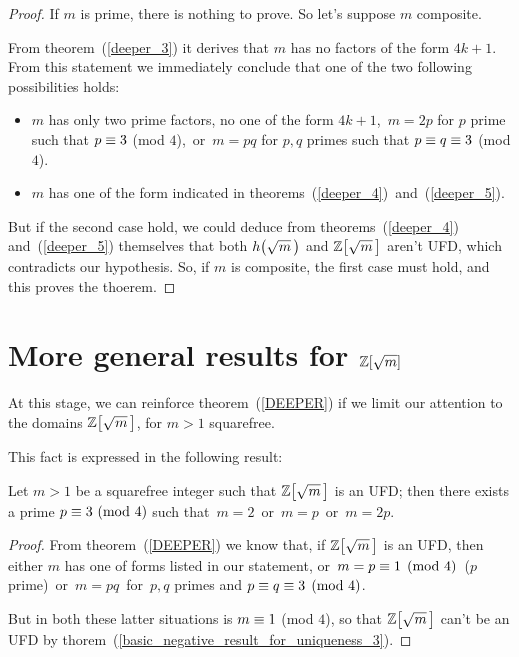 \begin{proof}
%
If $m$ is prime, there is nothing to prove. So let's
suppose $m$ composite.

From theorem~(\ref{deeper_3}) it derives
that $m$ has no factors of the form $4k + 1$.
From this statement we immediately conclude that one of
the two following possibilities holds:
\begin{itemize}

\item\: $m$ has only two prime factors, no one of the
form $4k + 1$, \ie\,$m = 2p$ for $p$ prime such that
$p \equiv 3$ (mod $4$),\, or\, $m = pq$ for $p,q$
primes such that $p \equiv q \equiv 3$ (mod $4$).

\item\: $m$ has one of the form indicated in
theorems~(\ref{deeper_4})~and~(\ref{deeper_5}).

\end{itemize}

But if the second case hold, we could deduce from
theorems~(\ref{deeper_4}) and~(\ref{deeper_5})
themselves that both $\hh{m}$ and $\ZZ{m}$ aren't UFD,
which contradicts our hypothesis.
So, if $m$ is composite, the first case must hold,
and this proves the thoerem.
%
\end{proof}

\section{More general results for $\mathbb{Z}[\sqrt{m}]$} 

At this stage, we can reinforce theorem~(\ref{DEEPER})
if we limit our attention to the domains
$\ZZ{m}$, for $m > 1$ squarefree.

This fact is expressed in the following result:

\begin{thm}\label{Z_deeper_1}
Let $m > 1$ be a squarefree integer such that
$\ZZ{m}$ is an UFD; then there exists
a prime $p \equiv 3\ \mathrm{(mod\ 4)}$ such that\,
$m = 2$\, or\, $m = p$ \,or\, $m = 2p$.
\end{thm}

\begin{proof}
%
From theorem~(\ref{DEEPER}) we know that, if $\ZZ{m}$ is an UFD,
then either $m$ has one of forms listed in our statement,
or\, $m = p \equiv 1 \pmod 4$\, ($p$ prime)\, or\,
$m = pq$\, for\, $p,q$ primes and $p \equiv q \equiv 3 \pmod 4$.

But in both these latter situations is $m \equiv 1$\!
(mod $4$), so that $\ZZ{m}$ can't be an UFD by
thorem~(\ref{basic_negative_result_for_uniqueness_3}).
%
\end{proof}

